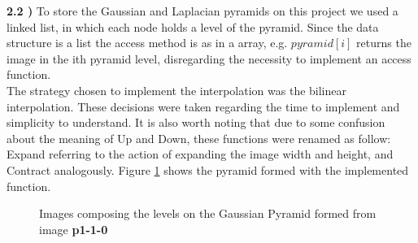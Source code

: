 \documentclass[12pt,a4paper]{article}
\begin{document}
\textbf{2.2 )} To store the Gaussian and Laplacian pyramids on this project we used a linked list, in which each node holds a level of the pyramid. Since the data structure is a list the access method is as in a array, e.g. $pyramid[i]$ returns the image in the ith pyramid level, disregarding the necessity to implement an access function. \\

The strategy chosen to implement the interpolation was the bilinear interpolation. These decisions were taken regarding the time to implement and simplicity to understand. It is also worth noting that due to some confusion about the meaning of Up and Down, these functions were renamed as follow: Expand referring to the action of expanding the image width and height, and Contract analogously. Figure \ref{fig:gaussianPyramid} shows the pyramid formed with the implemented function. \\

\begin{figure}[!h]
	\centering
	\quad
	\quad
	\caption{Images composing the levels on the Gaussian Pyramid formed from image \textbf{p1-1-0}}
	\label{fig:gaussianPyramid}
\end{figure}
\end{document}
